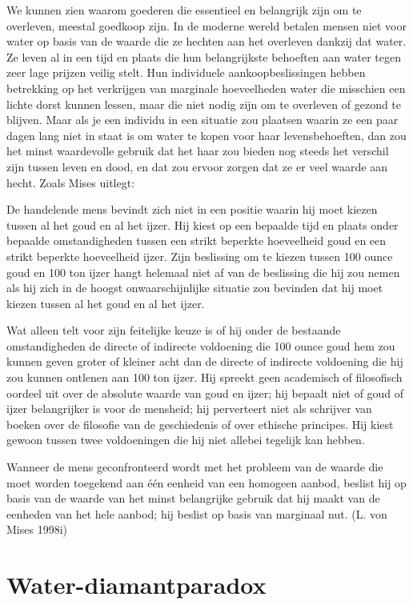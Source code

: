 \documentclass[
  a5paper,
  smalldemyvopaper,11pt,twoside,onecolumn,openright,extrafontsizes,
hidelinks]{memoir}
\begin{document}
We kunnen zien waarom goederen die essentieel en belangrijk zijn om te
overleven, meestal goedkoop zijn. In de moderne wereld betalen mensen
niet voor water op basis van de waarde die ze hechten aan het overleven
dankzij dat water. Ze leven al in een tijd en plaats die hun
belangrijkste behoeften aan water tegen zeer lage prijzen veilig stelt.
Hun individuele aankoopbeslissingen hebben betrekking op het verkrijgen
van marginale hoeveelheden water die misschien een lichte dorst kunnen
lessen, maar die niet nodig zijn om te overleven of gezond te blijven.
Maar als je een individu in een situatie zou plaatsen waarin ze een paar
dagen lang niet in staat is om water te kopen voor haar levensbehoeften,
dan zou het minst waardevolle gebruik dat het haar zou bieden nog steeds
het verschil zijn tussen leven en dood, en dat zou ervoor zorgen dat ze
er veel waarde aan hecht. Zoals Mises uitlegt:

De handelende mens bevindt zich niet in een positie waarin hij moet
kiezen tussen al het goud en al het ijzer. Hij kiest op een bepaalde
tijd en plaats onder bepaalde omstandigheden tussen een strikt beperkte
hoeveelheid goud en een strikt beperkte hoeveelheid ijzer. Zijn
beslissing om te kiezen tussen 100 ounce goud en 100 ton ijzer hangt
helemaal niet af van de beslissing die hij zou nemen als hij zich in de
hoogst onwaarschijnlijke situatie zou bevinden dat hij moet kiezen
tussen al het goud en al het ijzer.

Wat alleen telt voor zijn feitelijke keuze is of hij onder de bestaande
omstandigheden de directe of indirecte voldoening die 100 ounce goud hem
zou kunnen geven groter of kleiner acht dan de directe of indirecte
voldoening die hij zou kunnen ontlenen aan 100 ton ijzer. Hij spreekt
geen academisch of filosofisch oordeel uit over de absolute waarde van
goud en ijzer; hij bepaalt niet of goud of ijzer belangrijker is voor de
mensheid; hij perverteert niet als schrijver van boeken over de
filosofie van de geschiedenis of over ethische principes. Hij kiest
gewoon tussen twee voldoeningen die hij niet allebei tegelijk kan
hebben.

Wanneer de mens geconfronteerd wordt met het probleem van de waarde die
moet worden toegekend aan één eenheid van een homogeen aanbod, beslist
hij op basis van de waarde van het minst belangrijke gebruik dat hij
maakt van de eenheden van het hele aanbod; hij beslist op basis van
marginaal nut. (L. von Mises 1998i)

\section{Water-diamantparadox}\label{water-diamantparadox}
\end{document}
